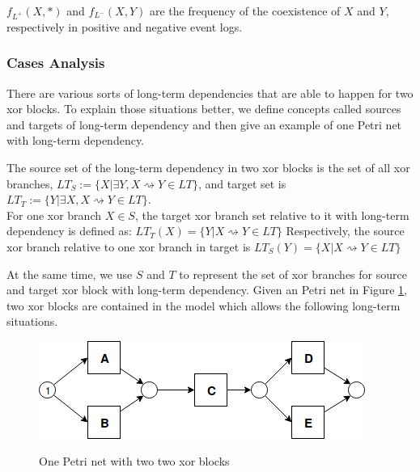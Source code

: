 $f_{L^+}(X, *) $ and $f_{L^-}(X, Y)$ are the frequency of the coexistence of $X$ and $Y$, respectively in positive and negative event logs.
\subsubsection{Cases Analysis}
There are various sorts of long-term dependencies that are able to happen for two xor blocks. To explain those situations better, we define concepts called sources and targets of long-term dependency and then give an example of one Petri net with long-term dependency.
\begin{definition}
	The source set of the long-term dependency in two xor blocks is the set of all  xor branches, $LT_S:= \{X \vert \exists Y, X\rightsquigarrow Y  \in LT \} $, and target set is $LT_T:= \{Y \vert \exists X, X\rightsquigarrow Y \in LT \} $. \\
	For one xor branch $X \in S$, the target xor branch set relative to it with long-term dependency is defined as:
	$ LT_T(X)= \{Y \vert  X\rightsquigarrow Y \in LT \}$
	Respectively, the source xor branch relative to one xor branch in target is
	$ LT_S(Y)= \{X \vert  X\rightsquigarrow Y \in LT \}$
\end{definition}
At the same time, we use $S $ and $T$ to represent the set of xor branches for source and target xor block with long-term dependency.
Given an Petri net in Figure \ref{fig:seq-2-original}, two xor blocks are contained in the model which allows the following long-term situations.
\begin{figure}
	\centering
	\includegraphics[width=\linewidth]{figures/algorithm/LT_Seq_01_Original.png}
	\label{fig:seq-2-original}
	\caption{One Petri net with two two xor blocks}
\end{figure}
